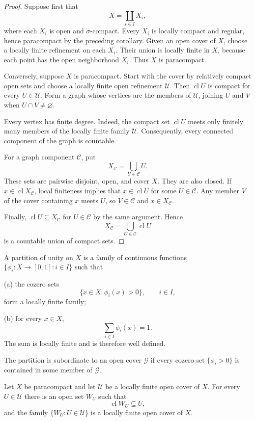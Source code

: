 \begin{proof}
Suppose first that
\[
X=\coprod_{i\in I}X_i,
\]
where each $X_i$ is open and $\sigma$-compact. Every $X_i$ is locally compact
and regular, hence paracompact by the preceding corollary. Given an open cover
of $X$, choose a locally finite refinement on each $X_i$. Their union is
locally finite in $X$, because each point has the open neighborhood $X_i$.
Thus $X$ is paracompact.

Conversely, suppose $X$ is paracompact. Start with the cover by relatively
compact open sets and choose a locally finite open refinement $\mathcal{U}$.
Then $\operatorname{cl}U$ is compact for every $U\in\mathcal{U}$. Form a graph
whose vertices are the members of $\mathcal{U}$, joining $U$ and $V$ when
$U\cap V\neq\varnothing$.

Every vertex has finite degree. Indeed, the compact set
$\operatorname{cl}U$ meets only finitely many members of the locally finite
family $\mathcal{U}$. Consequently, every connected component of the graph is
countable.

For a graph component $\mathcal{C}$, put
\[
X_{\mathcal{C}}=\bigcup_{U\in\mathcal{C}}U.
\]
These sets are pairwise disjoint, open, and cover $X$. They are also closed.
If $x\in\operatorname{cl}X_{\mathcal{C}}$, local finiteness implies that
$x\in\operatorname{cl}U$ for some $U\in\mathcal{C}$. Any member $V$ of the
cover containing $x$ meets $U$, so $V\in\mathcal{C}$ and
$x\in X_{\mathcal{C}}$.

Finally, $\operatorname{cl}U\subseteq X_{\mathcal{C}}$ for
$U\in\mathcal{C}$ by the same argument. Hence
\[
X_{\mathcal{C}}
=
\bigcup_{U\in\mathcal{C}}\operatorname{cl}U
\]
is a countable union of compact sets.
\end{proof}

\begin{de}
A partition of unity on $X$ is a family of continuous functions
$\{\phi_i:X\to[0,1]:i\in I\}$ such that

(a) the cozero sets
\[
\{x\in X:\phi_i(x)>0\},\qquad i\in I,
\]
form a locally finite family;

(b) for every $x\in X$,
\[
\sum_{i\in I}\phi_i(x)=1.
\]
The sum is locally finite and is therefore well defined.

The partition is subordinate to an open cover $\mathcal{G}$ if every cozero
set $\{\phi_i>0\}$ is contained in some member of $\mathcal{G}$.
\end{de}

\begin{lem}
Let $X$ be paracompact and let $\mathcal{U}$ be a locally finite open cover of
$X$. For every $U\in\mathcal{U}$ there is an open set $W_U$ such that
\[
\operatorname{cl}W_U\subseteq U,
\]
and the family $\{W_U:U\in\mathcal{U}\}$ is a locally finite open cover of
$X$.
\end{lem}

